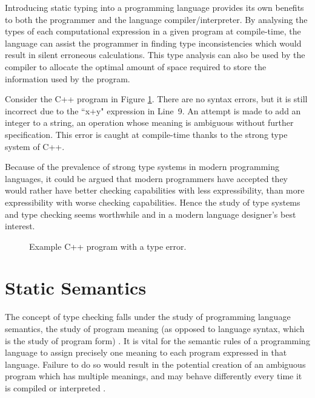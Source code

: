 \documentclass{UoYCSproject}
\begin{document}
Introducing static typing into a programming language provides its own benefits
to both the programmer and the language compiler/interpreter. By analysing the
types of each computational expression in a given program at compile-time,
the language can assist the programmer in finding type
inconsistencies which would result in silent erroneous calculations. This type
analysis can also be used by the compiler to allocate the optimal amount of
space required to store the information used by the program.

Consider the C++ program in Figure \ref{fig:C++TypeError}.
There are no syntax errors, but it is still incorrect due to the
``x+y" expression in Line~9. An attempt is made to add an integer to a string,
an operation whose meaning is ambiguous without further specification. This
error is caught at compile-time thanks to the strong type system of C++.

Because of the prevalence of strong type systems in modern programming
languages, it could be argued that modern programmers have accepted they would
rather have better checking capabilities with less expressibility, than more
expressibility with worse checking capabilities. Hence the study of type systems
and type checking seems worthwhile and in a modern language designer's best
interest.

\begin{figure}


\caption{Example C++ program with a type error.}
\label{fig:C++TypeError}
\end{figure}

\section{Static Semantics}
The concept of type checking falls under the study of programming language
semantics, the study of program meaning (as opposed to language syntax, which is
the study of program form) \cite[\S3.1, p.~114]{Sebesta}. It is vital for the 
semantic rules of a programming language to assign precisely one meaning to 
each program expressed in that language. Failure to do so would result in the 
potential creation of an ambiguous program which has multiple meanings, and may 
behave differently every time it is compiled or interpreted 
\cite[\S3.3.1.7 ,p.~123]{Sebesta}.
\end{document}
